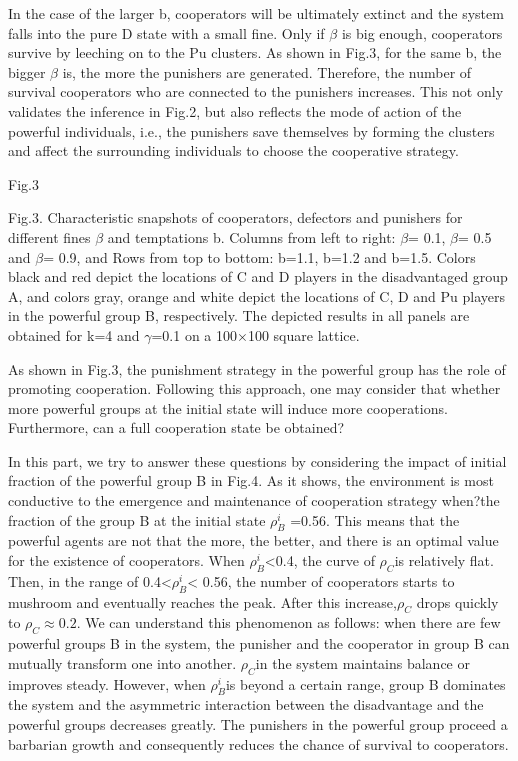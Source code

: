 \documentclass[%
 aip,
 amsmath,amssymb,
 reprint,%
]{revtex4-1}
\begin{document}
In the case of the larger b, cooperators will be ultimately extinct and the system falls into the pure D state with a small fine. Only if $\beta$ is big enough, cooperators survive by leeching on to the Pu clusters. As shown in Fig.3, for the same b, the bigger $\beta$ is, the more the punishers are generated. Therefore, the number of survival cooperators who are connected to the punishers increases. This not only validates the inference in Fig.2, but also reflects the mode of action of the powerful individuals, i.e., the punishers save themselves by forming the clusters and affect the surrounding individuals to choose the cooperative strategy.

Fig.3

Fig.3. Characteristic snapshots of cooperators, defectors and punishers for different fines $\beta$ and temptations b. Columns from left to right: $\beta$= 0.1, $\beta$= 0.5 and $\beta$= 0.9, and Rows from top to bottom: b=1.1, b=1.2 and b=1.5. Colors black and red depict the locations of C and D players in the disadvantaged group A, and colors gray, orange and white depict the locations of C, D and Pu players in the powerful group B, respectively. The depicted results in all panels are obtained for k=4 and $\gamma$=0.1 on a 100$\times$100 square lattice.

As shown in Fig.3, the punishment strategy in the powerful group has the role of promoting cooperation. Following this approach, one may consider that whether more powerful groups at the initial state will induce more cooperations. Furthermore, can a full cooperation state be obtained?

In this part, we try to answer these questions by considering the impact of initial fraction of the powerful group B in Fig.4. As it shows, the environment is most conductive to the emergence and maintenance of cooperation strategy when?the fraction of the group B at the initial state $\rho_{B}^{i}$ =0.56. This means that the powerful agents are not that the more, the better, and there is an optimal value for the existence of cooperators. When $\rho_{B}^{i}$<0.4, the curve of $\rho_{C}$is relatively flat. Then, in the range of 0.4<$\rho_{B}^{i}$< 0.56, the number of cooperators starts to mushroom and eventually reaches the peak. After this increase,$\rho_{C}$ drops quickly to $\rho_{C}\approx0.2$. We can understand this phenomenon as follows: when there are few powerful groups B in the system, the punisher and the cooperator in group B can mutually transform one into another. $\rho_{C}$in the system maintains balance or improves steady. However, when $\rho_{B}^{i}$is beyond a certain range, group B dominates the system and the asymmetric interaction between the disadvantage and the powerful groups decreases greatly. The punishers in the powerful group proceed a barbarian growth and consequently reduces the chance of survival to cooperators.
\end{document}
